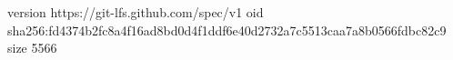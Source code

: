 version https://git-lfs.github.com/spec/v1
oid sha256:fd4374b2fc8a4f16ad8bd0d4f1ddf6e40d2732a7c5513caa7a8b0566fdbc82c9
size 5566

